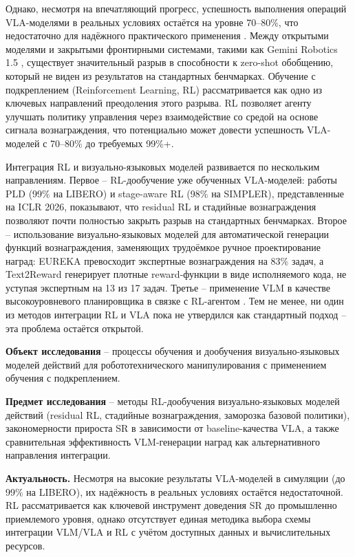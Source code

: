     Однако, несмотря на впечатляющий прогресс, успешность выполнения операций VLA-моделями в реальных условиях остаётся на уровне 70--80\%, что недостаточно для надёжного практического применения \cite{reuss2025blog}. Между открытыми моделями и закрытыми фронтирными системами, такими как Gemini Robotics 1.5 \cite{deepmind2025gemini}, существует значительный разрыв в способности к zero-shot обобщению, который не виден из результатов на стандартных бенчмарках. Обучение с подкреплением (Reinforcement Learning, RL) рассматривается как одно из ключевых направлений преодоления этого разрыва. RL позволяет агенту улучшать политику управления через взаимодействие со средой на основе сигнала вознаграждения, что потенциально может довести успешность VLA-моделей с 70--80\% до требуемых 99\%+.

    Интеграция RL и визуально-языковых моделей развивается по нескольким направлениям. Первое -- RL-дообучение уже обученных VLA-моделей: работы PLD \cite{pld2026} (99\% на LIBERO) и stage-aware RL \cite{starevla2025} (98\% на SIMPLER), представленные на ICLR 2026, показывают, что residual RL и стадийные вознаграждения позволяют почти полностью закрыть разрыв на стандартных бенчмарках. Второе -- использование визуально-языковых моделей для автоматической генерации функций вознаграждения, заменяющих трудоёмкое ручное проектирование наград: EUREKA \cite{ma2024eureka} превосходит экспертные вознаграждения на 83\% задач, а Text2Reward \cite{xie2024text2reward} генерирует плотные reward-функции в виде исполняемого кода, не уступая экспертным на 13 из 17 задач. Третье -- применение VLM в качестве высокоуровневого планировщика в связке с RL-агентом \cite{ahn2022saycan, embodiedr1_2026}. Тем не менее, ни один из методов интеграции RL и VLA пока не утвердился как стандартный подход -- эта проблема остаётся открытой.

    \textbf{Объект исследования} -- процессы обучения и дообучения визуально-языковых моделей действий для робототехнического манипулирования с применением обучения с подкреплением.

    \textbf{Предмет исследования} -- методы RL-дообучения визуально-языковых моделей действий (residual RL, стадийные вознаграждения, заморозка базовой политики), закономерности прироста SR в зависимости от baseline-качества VLA, а также сравнительная эффективность VLM-генерации наград как альтернативного направления интеграции.

    \textbf{Актуальность.} Несмотря на высокие результаты VLA-моделей в симуляции (до 99\% на LIBERO), их надёжность в реальных условиях остаётся недостаточной. RL рассматривается как ключевой инструмент доведения SR до промышленно приемлемого уровня, однако отсутствует единая методика выбора схемы интеграции VLM/VLA и RL с учётом доступных данных и вычислительных ресурсов.

